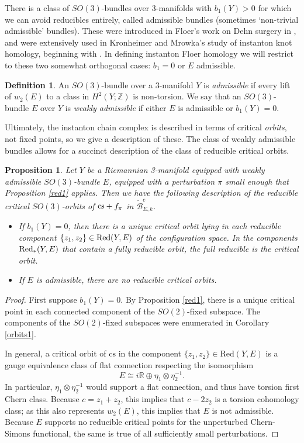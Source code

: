\documentclass[10pt,a4paper]{amsart}
\newtheorem{proposition}[theorem]{Proposition}
\theoremstyle{definition}
\newtheorem{definition}[theorem]{Definition}
\theoremstyle{remark}
\numberwithin{figure}{qchap}
\begin{document}
There is a class of $SO(3)$-bundles over 3-manifolds with $b_1(Y) > 0$ for which we can avoid reducibles entirely, called admissible bundles (sometimes `non-trivial admissible' bundles). These were introduced in Floer's work on Dehn surgery in \cite{floer1995instanton}, and were extensively used in Kronheimer and Mrowka's study of instanton knot homology, beginning with \cite{KM1}. In defining instanton Floer homology we will restrict to these two somewhat orthogonal cases: $b_1 = 0$ or $E$ admissible.

\begin{definition}\label{admiss-3m}An $SO(3)$-bundle over a 3-manifold $Y$ is \textit{admissible} if every lift of $w_2(E)$ to a class in $H^2(Y;\mathbb Z)$ is non-torsion. We say that an $SO(3)$-bundle $E$ over $Y$ is \textit{weakly admissible} if either $E$ is admissible or $b_1(Y) = 0$.\end{definition}

Ultimately, the instanton chain complex is described in terms of critical \textit{orbits}, not fixed points, so we give a description of these. The class of weakly admissible bundles allows for a succinct description of the class of reducible critical orbits.

\begin{proposition}\label{redcrit}Let $Y$ be a Riemannian 3-manifold equipped with weakly admissible $SO(3)$-bundle $E$, equipped with a perturbation $\pi$ small enough that Proposition \ref{red1} applies. Then we have the following description of the reducible critical $SO(3)$-orbits of $\textup{cs}+f_\pi$ in $\widetilde{\mathcal B}^e_{E,k}$.
\begin{itemize}
    \item If $b_1(Y) = 0$, then there is a unique critical orbit lying in each reducible component $\{z_1, z_2\} \in \textup{Red}(Y,E)$ of the configuration space. In the components $\textup{Red}_*(Y,E)$ that contain a fully reducible orbit, the full reducible is the critical orbit.
    \item If $E$ is admissible, there are no reducible critical orbits.
\end{itemize}
\end{proposition}

\begin{proof}First suppose $b_1(Y) = 0$. By Proposition \ref{red1}, there is a unique critical point in each connected component of the $SO(2)$-fixed subspace. The components of the $SO(2)$-fixed subspaces were enumerated in Corollary \ref{orbits1}.

In general, a critical orbit of $\text{cs}$ in the component $\{z_1, z_2\} \in \text{Red}(Y,E)$ is a gauge equivalence class of flat connection respecting the isomorphism 
$$E \cong i\mathbb R \oplus \eta_1 \otimes \eta_2^{-1}.$$ 
In particular, $\eta_1 \otimes \eta_2^{-1}$ would support a flat connection, and thus have torsion first Chern class. Because $c = z_1 + z_2$, this implies that $c - 2z_2$ is a torsion cohomology class; as this also represents $w_2(E)$, this implies that $E$ is not admissible. Because $E$ supports no reducible critical points for the unperturbed Chern-Simons functional, the same is true of all sufficiently small perturbations.
\end{proof}
\end{document}
